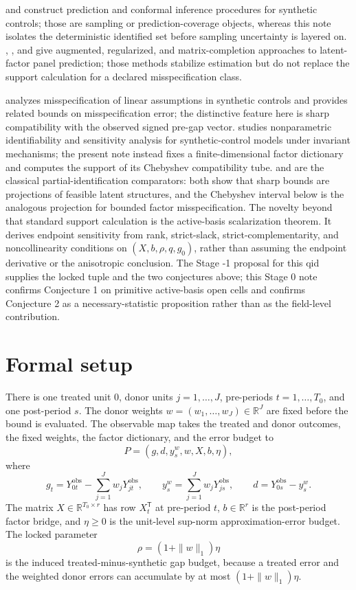 \documentclass[11pt]{article}
\newcommand{\transpose}{\mathsf{T}}
\newcommand{\R}{\mathbb{R}}
\theoremstyle{definition}
\theoremstyle{plain}
\theoremstyle{remark}
\begin{document}
\cite{CattaneoFengTitiunik2021} and \cite{ChernozhukovWuthrichZhu2021}
construct prediction and conformal inference procedures for synthetic controls;
those are sampling or prediction-coverage objects, whereas this note isolates
the deterministic identified set before sampling uncertainty is layered on.
\cite{BenMichaelFellerRothstein2021},
\cite{ArkhangelskyAtheyHirshbergImbensWager2021}, and
\cite{AtheyBayatiDoudchenkoImbensKhosravi2021} give augmented, regularized, and
matrix-completion approaches to latent-factor panel prediction; those methods
stabilize estimation but do not replace the support calculation for a declared
misspecification class.

\cite{NazaretShiBlei2024} analyzes misspecification of linear assumptions in
synthetic controls and provides related bounds on misspecification error; the
distinctive feature here is sharp compatibility with the observed signed
pre-gap vector.  \cite{ZeitlerVlontzosGilliganLee2023} studies nonparametric
identifiability and sensitivity analysis for synthetic-control models under
invariant mechanisms; the present note instead fixes a finite-dimensional
factor dictionary and computes the support of its Chebyshev compatibility tube.
\cite{Manski1990} and \cite{BalkePearl1997} are the classical
partial-identification comparators: both show that sharp bounds are projections
of feasible latent structures, and the Chebyshev interval below is the analogous
projection for bounded factor misspecification.  The novelty beyond that
standard support calculation is the active-basis scalarization theorem.  It
derives endpoint sensitivity from rank, strict-slack, strict-complementarity,
and noncollinearity conditions on \((X,b,\rho,q,g_0)\), rather than assuming the
endpoint derivative or the anisotropic conclusion.  The Stage -1 proposal for
this qid supplies the locked tuple and the two conjectures above; this Stage 0
note confirms Conjecture 1 on primitive active-basis open cells and confirms
Conjecture 2 as a necessary-statistic proposition rather than as the
field-level contribution.

\section{Formal setup}
There is one treated unit \(0\), donor units \(j=1,\ldots,J\), pre-periods
\(t=1,\ldots,T_0\), and one post-period \(s\).  The donor weights
\(w=(w_1,\ldots,w_J)\in\R^J\) are fixed before the bound is evaluated.  The
observable map takes the treated and donor outcomes, the fixed weights, the
factor dictionary, and the error budget to
\[
P=(g,d,y_s^w,w,X,b,\eta),
\]
where
\[
g_t=Y_{0t}^{\mathrm{obs}}-\sum_{j=1}^Jw_jY_{jt}^{\mathrm{obs}},
\qquad
y_s^w=\sum_{j=1}^Jw_jY_{js}^{\mathrm{obs}},
\qquad
d=Y_{0s}^{\mathrm{obs}}-y_s^w.
\]
The matrix \(X\in\R^{T_0\times r}\) has row \(X_t^\transpose\) at pre-period
\(t\), \(b\in\R^r\) is the post-period factor bridge, and \(\eta\ge0\) is the
unit-level sup-norm approximation-error budget.  The locked parameter
\[
\rho=(1+\|w\|_1)\eta
\]
is the induced treated-minus-synthetic gap budget, because a treated error and
the weighted donor errors can accumulate by at most \((1+\|w\|_1)\eta\).
\end{document}
